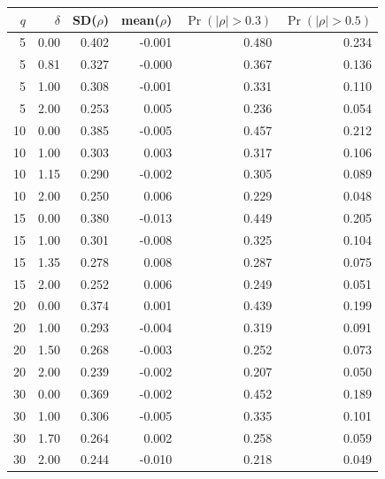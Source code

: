 \begin{tabular}{rrrrrr}
\hline
$q$ & $\delta$ & SD($\rho$) & mean($\rho$) & $\Pr(|\rho|>0.3)$ & $\Pr(|\rho|>0.5)$ \\
\hline
5 & 0.00 & 0.402 & -0.001 & 0.480 & 0.234 \\
5 & 0.81 & 0.327 & -0.000 & 0.367 & 0.136 \\
5 & 1.00 & 0.308 & -0.001 & 0.331 & 0.110 \\
5 & 2.00 & 0.253 & 0.005 & 0.236 & 0.054 \\
10 & 0.00 & 0.385 & -0.005 & 0.457 & 0.212 \\
10 & 1.00 & 0.303 & 0.003 & 0.317 & 0.106 \\
10 & 1.15 & 0.290 & -0.002 & 0.305 & 0.089 \\
10 & 2.00 & 0.250 & 0.006 & 0.229 & 0.048 \\
15 & 0.00 & 0.380 & -0.013 & 0.449 & 0.205 \\
15 & 1.00 & 0.301 & -0.008 & 0.325 & 0.104 \\
15 & 1.35 & 0.278 & 0.008 & 0.287 & 0.075 \\
15 & 2.00 & 0.252 & 0.006 & 0.249 & 0.051 \\
20 & 0.00 & 0.374 & 0.001 & 0.439 & 0.199 \\
20 & 1.00 & 0.293 & -0.004 & 0.319 & 0.091 \\
20 & 1.50 & 0.268 & -0.003 & 0.252 & 0.073 \\
20 & 2.00 & 0.239 & -0.002 & 0.207 & 0.050 \\
30 & 0.00 & 0.369 & -0.002 & 0.452 & 0.189 \\
30 & 1.00 & 0.306 & -0.005 & 0.335 & 0.101 \\
30 & 1.70 & 0.264 & 0.002 & 0.258 & 0.059 \\
30 & 2.00 & 0.244 & -0.010 & 0.218 & 0.049 \\
\hline
\end{tabular}
